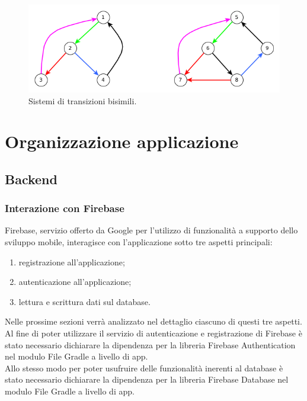 \documentclass[a4paper,11pt,twoside,openright]{report}
\begin{document}
\begin{figure}[h]
\includegraphics[width=\textwidth]{images/Example.png}
\caption{Sistemi di transizioni bisimili.}
\end{figure}

\chapter{Organizzazione applicazione}
\section{Backend}
\subsection{Interazione con Firebase}
Firebase, servizio offerto da Google per l'utilizzo di funzionalità a supporto dello sviluppo mobile, interagisce con l'applicazione sotto tre aspetti principali:

\begin{enumerate}
\item registrazione all'applicazione;

\item autenticazione all'applicazione;

\item lettura e scrittura dati sul database.
\end{enumerate}

Nelle prossime sezioni verrà analizzato nel dettaglio ciascuno di questi tre aspetti.\\
Al fine di poter utilizzare il servizio di autenticazione e registrazione di Firebase è stato necessario dichiarare la dipendenza per la libreria Firebase Authentication nel modulo File Gradle a livello di app.\\
Allo stesso modo per poter usufruire delle funzionalità inerenti al database è stato necessario dichiarare la dipendenza per la libreria Firebase Database nel modulo File Gradle a livello di app.
\end{document}
